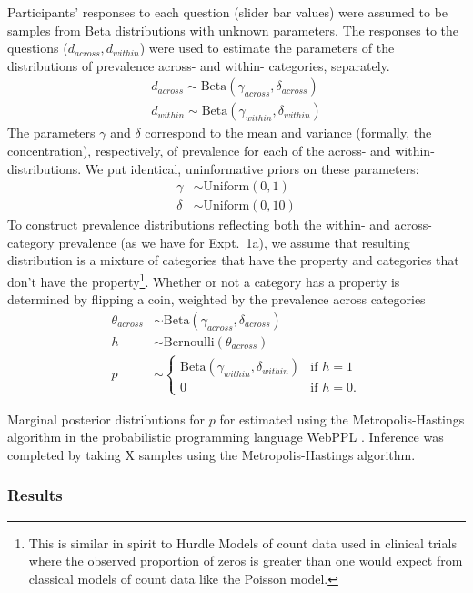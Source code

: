 \documentclass[10pt,letterpaper]{article}
\begin{document}
Participants' responses to each question (slider bar values) were assumed to be samples from Beta distributions with unknown parameters. 
The responses to the questions ($d_{across}, d_{within}$) were used to estimate the parameters of the distributions of prevalence across- and within- categories, separately. 
\begin{align*}
d_{across} \sim \text{Beta}(\gamma_{across}, \delta_{across}) \\
d_{within} \sim \text{Beta}(\gamma_{within}, \delta_{within}) 
\end{align*}
The parameters $\gamma$ and $\delta$ correspond to the mean and variance (formally, the concentration), respectively, of prevalence for each of the across- and within- distributions. 
We put identical, uninformative priors on these parameters:
\begin{align*}
\gamma & \sim \text{Uniform}(0,1) \\
\delta & \sim \text{Uniform}(0,10)
\end{align*}
To construct prevalence distributions reflecting both the within- and across- category prevalence (as we have for Expt.~1a), we assume that resulting distribution is a mixture of categories that have the property and categories that don't have the property\footnote{This is similar in spirit to Hurdle Models of count data used in clinical trials where the observed proportion of zeros is greater than one would expect from classical models of count data like the Poisson model.}. Whether or not a category has a property is determined by flipping a coin, weighted by the prevalence across categories
\begin{align*}
\theta_{across} & \sim \text{Beta}(\gamma_{across}, \delta_{across}) \\ 
h & \sim \text{Bernoulli}(\theta_{across}) \\
p & \sim \begin{cases} 
		\text{Beta}(\gamma_{within}, \delta_{within}) &\mbox{if } h = 1 \\ 
				0 & \mbox{if } h=0. 
				\end{cases} 
\end{align*}

Marginal posterior distributions for $p$ for estimated using the Metropolis-Hastings algorithm in the probabilistic programming language WebPPL \cite{dippl}. Inference was completed by taking X samples using the Metropolis-Hastings algorithm.

\subsubsection{Results}
\end{document}
